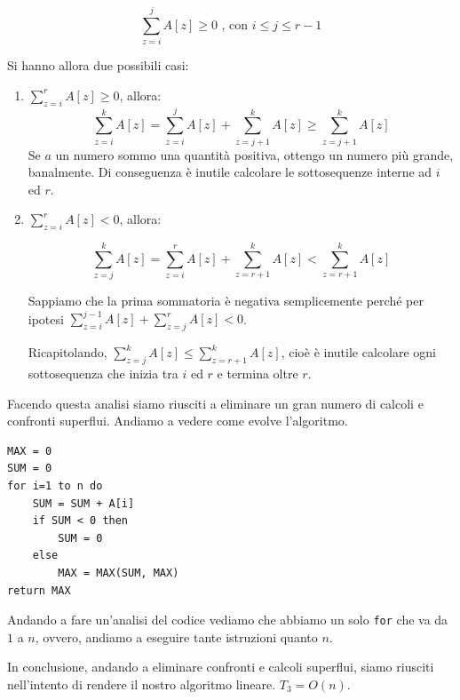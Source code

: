 \begin{equation}
    \sum_{z=i}^{j} A[z] \geq 0 \text{ , con } i \leq j \leq r-1
\end{equation}

Si hanno allora due possibili casi:

\begin{enumerate}
    \item $\displaystyle\sum_{z=i}^{r} A[z] \geq 0$, allora:
    \begin{displaymath}
        \sum_{z=i}^{k} A[z] = \sum_{z=i}^{j} A[z] + \displaystyle\sum_{z=j+1}^{k} A[z] \geq \displaystyle\sum_{z=j+1}^{k} A[z]
    \end{displaymath}
    Se $a$ un numero sommo una quantità positiva, ottengo un numero più grande, banalmente. Di conseguenza
    è inutile calcolare le sottosequenze interne ad $i$ ed $r$.

    \item $\displaystyle \sum_{z=i}^{r} A[z] < 0$, allora:

    \begin{displaymath}
        \sum_{z=j}^{k} A[z] = \sum_{z=i}^{r} A[z] + \sum_{z=r+1}^{k} A[z] < \sum_{z=r+1}^{k} A[z]
    \end{displaymath}

    Sappiamo che la prima sommatoria è negativa semplicemente perché per ipotesi $\displaystyle\sum_{z=i}^{j-1} A[z] + \sum_{z=j}^{r} A[z] < 0$.

    Ricapitolando, $\displaystyle\sum_{z=j}^{k} A[z] \leq \sum_{z=r+1}^{k} A[z]$, cioè è inutile calcolare ogni sottosequenza che inizia tra $i$ ed $r$ e termina oltre $r$.
\end{enumerate}

Facendo questa analisi siamo riusciti a eliminare un gran numero di calcoli e confronti superflui. Andiamo a vedere come evolve l'algoritmo.


\begin{lstlisting}[label = lst:MaxSum3, language=asd, caption={MaxSum3(A, n)}]
MAX = 0
SUM = 0
for i=1 to n do
    SUM = SUM + A[i]
    if SUM < 0 then
        SUM = 0
    else
        MAX = MAX(SUM, MAX)
return MAX
\end{lstlisting}

Andando a fare un'analisi del codice vediamo che abbiamo un solo \texttt{for} che va da $1$ a $n$, ovvero, andiamo a eseguire tante istruzioni quanto $n$.

In conclusione, andando a eliminare confronti e calcoli superflui, siamo riusciti nell'intento di rendere il nostro algoritmo lineare. $T_3 = O(n)$.
